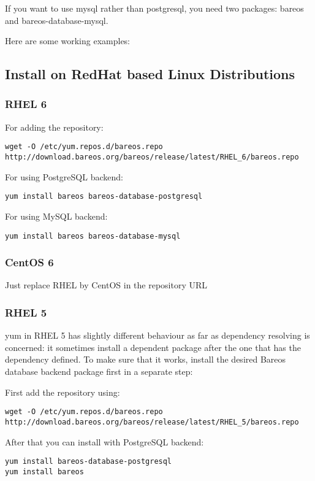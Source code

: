 If you want to use mysql rather than postgresql, you need two packages: bareos and bareos-database-mysql.

Here are some working examples:

\subsection{Install on RedHat based Linux Distributions}
\subsubsection{RHEL 6}

For adding the repository:
\begin{verbatim}
wget -O /etc/yum.repos.d/bareos.repo http://download.bareos.org/bareos/release/latest/RHEL_6/bareos.repo
\end{verbatim}

For using PostgreSQL backend:
\begin{verbatim}
yum install bareos bareos-database-postgresql
\end{verbatim}

For using MySQL backend:
\begin{verbatim}
yum install bareos bareos-database-mysql
\end{verbatim}

\subsubsection{CentOS 6}

Just replace RHEL by CentOS in the repository URL

\subsubsection{RHEL 5}

yum in RHEL 5 has slightly different behaviour as far as dependency resolving is concerned: it sometimes install a dependent package after the one that has the dependency defined. To make sure that it works, install the desired Bareos database backend package first in a separate step:

First add the repository using:
\begin{verbatim}
wget -O /etc/yum.repos.d/bareos.repo http://download.bareos.org/bareos/release/latest/RHEL_5/bareos.repo
\end{verbatim}

After that you can install with PostgreSQL backend:
\begin{verbatim}
yum install bareos-database-postgresql
yum install bareos
\end{verbatim}

